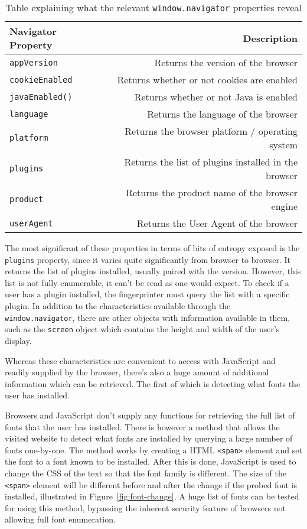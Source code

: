 \begin{table}[h]
\centering
\begin{tabular}{| l | r |}
    \hline
    \textbf{Navigator Property} & \textbf{Description} \\ \hline
    \texttt{appVersion} & {Returns the version of the browser} \\ \hline
    \texttt{cookieEnabled} & {Returns whether or not cookies are enabled} \\ \hline
    \texttt{javaEnabled()} & {Returns whether or not Java is enabled} \\ \hline
    \texttt{language} & {Returns the language of the browser} \\ \hline
    \texttt{platform} & {Returns the browser platform / operating system} \\ \hline
    \texttt{plugins} & {Returns the list of plugins installed in the browser} \\ \hline
    \texttt{product} & {Returns the product name of the browser engine} \\ \hline
    \texttt{userAgent} & {Returns the User Agent of the browser} \\
    \hline
\end{tabular}
\caption{Table explaining what the relevant \texttt{window.navigator} properties reveal}
\label{tab:navigator-props}
\end{table}

The most significant of these properties in terms of bits of entropy exposed is the \texttt{plugins} property, since it varies quite significantly from browser to browser.
It returns the list of plugins installed, usually paired with the version.
However, this list is not fully enumerable, it can't be read as one would expect.
To check if a user has a plugin installed, the fingerprinter must query the list with a specific plugin.
In addition to the characteristics available through the \texttt{window.navigator}, there are other objects with information available in them, such as the \texttt{screen} object which contains the height and width of the user's display.

Whereas these characteristics are convenient to access with JavaScript and readily supplied by the browser, there's also a huge amount of additional information which can be retrieved.
The first of which is detecting what fonts the user has installed.

Browsers and JavaScript don't supply any functions for retrieving the full list of fonts that the user has installed.
There is however a method that allows the visited website to detect what fonts are installed by querying a large number of fonts one-by-one.
The method works by creating a HTML \texttt{<span>} element and set the font to a font known to be installed.
After this is done, JavaScript is used to change the CSS of the text so that the font family is different.
The size of the \texttt{<span>} element will be different before and after the change if the probed font is installed, illustrated in Figure~\ref{fig:font-change}.
A huge list of fonts can be tested for using this method, bypassing the inherent security feature of browsers not allowing full font enumeration.

